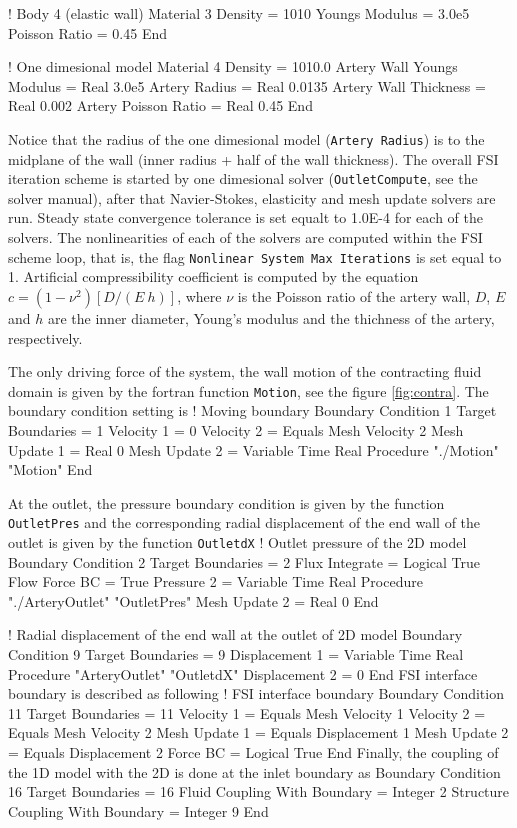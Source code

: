 ! Body 4 (elastic wall)
Material 3
  Density = 1010
  Youngs Modulus = 3.0e5
  Poisson Ratio = 0.45
End

! One dimesional model
Material 4
   Density = 1010.0
   Artery Wall Youngs Modulus = Real 3.0e5 
   Artery Radius = Real 0.0135 
   Artery Wall Thickness = Real 0.002
   Artery Poisson Ratio  = Real 0.45
End
\ttend

Notice that the radius of the one dimesional model ({\tt Artery Radius})
is to the midplane of the wall (inner radius + half of the wall thickness).
The overall FSI iteration scheme is started by one dimesional solver
({\tt OutletCompute}, see the solver manual), after that Navier-Stokes, 
elasticity and mesh update solvers are run.  Steady state convergence tolerance
is set equalt to 1.0E-4 for each of the solvers.  The nonlinearities
of each of the solvers are computed within the FSI scheme loop, that is,
the flag {\tt Nonlinear System Max Iterations} is set equal to 1.
Artificial compressibility coefficient is computed by the equation
$c = (1-\nu^2) [D/(E~h)]$, where $\nu$ is the Poisson ratio of the
artery wall, $D$, $E$ and $h$ are the inner diameter, Young's modulus
and the thichness of the artery, respectively.

The only driving force of the system, the wall motion of the contracting 
fluid domain is given by the fortran function {\tt Motion}, see the
figure \ref{fig:contra}.  The boundary condition setting is
\ttbegin
! Moving boundary
Boundary Condition 1
  Target Boundaries = 1
  Velocity 1 = 0
  Velocity 2 = Equals Mesh Velocity 2
  Mesh Update 1 = Real 0
  Mesh Update 2 = Variable Time
       Real Procedure "./Motion" "Motion"
End
\ttend

At the outlet, the pressure boundary condition is given by the
function {\tt OutletPres} and the corresponding radial displacement
of the end wall of the outlet is given by the function {\tt OutletdX}
\ttbegin
! Outlet pressure of the 2D model
Boundary Condition 2
  Target Boundaries = 2
  Flux Integrate = Logical True
  Flow Force BC = True
  Pressure 2 = Variable Time
      Real Procedure "./ArteryOutlet" "OutletPres"
  Mesh Update 2 = Real 0
End

! Radial displacement of the end wall at the outlet of 2D model
Boundary Condition 9
  Target Boundaries = 9
  Displacement 1 = Variable Time
      Real Procedure "ArteryOutlet" "OutletdX"
  Displacement 2 = 0 
End
\ttend
FSI interface boundary is described as following
\ttbegin
! FSI interface boundary
Boundary Condition 11
  Target Boundaries = 11
  Velocity 1 = Equals Mesh Velocity 1
  Velocity 2 = Equals Mesh Velocity 2
  Mesh Update 1 = Equals Displacement 1
  Mesh Update 2 = Equals Displacement 2
  Force BC = Logical True
End
\ttend
Finally, the coupling of the 1D model with the 2D is 
done at the inlet boundary as
\ttbegin
Boundary Condition 16
  Target Boundaries = 16
  Fluid Coupling With Boundary = Integer 2
  Structure Coupling With Boundary = Integer 9
End
\ttend


